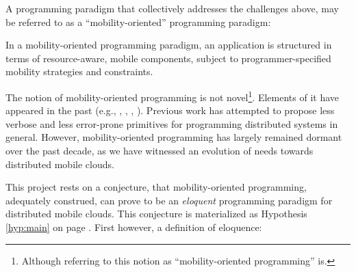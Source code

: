 A programming paradigm that collectively addresses the challenges
above, may be referred to as a ``mobility-oriented'' programming
paradigm:

\begin{definition}

In a mobility-oriented programming paradigm, an application is
structured in terms of resource-aware, mobile components, subject to
programmer-specified mobility strategies and constraints.

\end{definition} 

The notion of mobility-oriented programming is not
novel\footnote{Although referring to this notion as
``mobility-oriented programming'' is.}. Elements of it have appeared
in the past (e.g., \cite{emerald:tocs:1988},
\cite{1998-Understanding-code-mobility}, \cite{1998-KLAIM},
\cite{2004-Context-Awareness-Mobility}). Previous work has attempted
to propose less verbose and less error-prone primitives for
programming distributed systems in general. However, mobility-oriented
programming has largely remained dormant over the past decade, as we
have witnessed an evolution of needs towards distributed mobile
clouds.

This project rests on a conjecture, that mobility-oriented
programming, adequately construed, can prove to be an \emph{eloquent}
programming paradigm for distributed mobile clouds. This conjecture is
materialized as Hypothesis \ref{hyp:main} on page \pageref{hyp:main}.
First however, a definition of eloquence:





